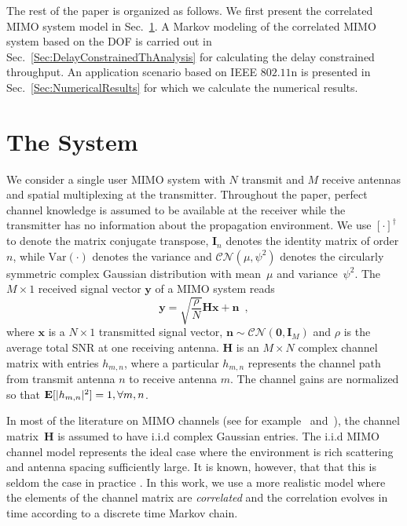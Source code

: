 \documentclass[10pt,conference]{IEEEtran}
\newcommand{\Ex}{\mathop{\bf E\/}}
\begin{document}
The rest of the paper is organized as follows.
We first present the correlated MIMO system model in Sec.~\ref{sec:prelim}. A Markov modeling of the correlated MIMO system based on the DOF is carried out in Sec.~\ref{Sec:DelayConstrainedThAnalysis} for calculating the delay constrained throughput.
An application scenario based on IEEE $802.11$n is presented in Sec.~\ref{Sec:NumericalResults} for which we calculate the numerical results.

\section{The System}
\label{sec:prelim}


We consider a single user MIMO system with $N$ transmit and $M$ receive antennas and spatial multiplexing at the transmitter.
Throughout the paper, perfect channel knowledge is assumed to be available at the receiver while the transmitter has no information about the propagation environment.
We use $[\cdot]^\dag$ to denote the matrix conjugate transpose, $\mathbf{I}_n$ denotes the identity matrix of order $n$, while $\mathrm{Var}(\cdot)$ denotes the variance and $\mathcal{CN}(\mu,\psi^2)$ denotes the circularly symmetric complex Gaussian distribution with mean~$\mu$ and variance~$\psi^2$.
The $M \times 1$ received signal vector $\mathbf{y}$ of a MIMO system reads
\begin{equation}
	\label{eq:system_model}
\mathbf{y} = \sqrt{\frac{\rho}{N}} \mathbf{Hx}+\mathbf{n} \enspace ,	
\end{equation}
where $\mathbf{x}$ is a $N \times 1$ transmitted signal vector, $\mathbf{n} \sim \mathcal{CN}(\mathbf{0},\mathbf{I}_M)$ and $\rho$ is the average total SNR at one receiving antenna.
$\mathbf{H}$ is an $M \times N$ complex channel matrix with entries $h_{m,n}$, where a particular $h_{m,n}$ represents the channel path from transmit antenna $n$ to receive antenna $m$.
The channel gains are normalized so that $\Ex [|h_{m,n}|^2]=1,\forall m,n$.



In most of the literature on MIMO channels (see for example \cite{MIMO:Foschini:98:limits}~and~\cite{MIMO:Teletar99:CapacityOfMultiAntennaGaus}), the channel matrix~$\mathbf{H}$ is assumed to have i.i.d complex Gaussian entries.
The i.i.d  MIMO channel model represents the ideal case where the environment is rich scattering and antenna spacing sufficiently large.
It is known, however, that that this is seldom the case in practice \cite{MIMO:Correlated:Sayeed02:Deconstructing,MIMO:Veeravalli2005:CorrelatedMIMO:Variance}.
In this work, we use a more realistic model where the elements of the channel matrix are \emph{correlated} and the correlation evolves in time according to a discrete time Markov chain.
\end{document}
